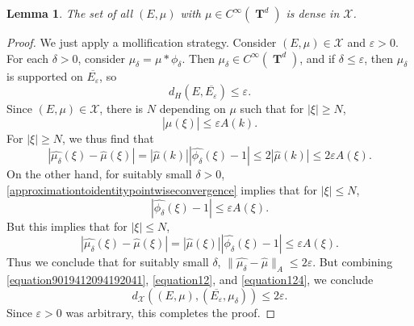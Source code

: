 \documentclass[12pt,reqno]{article}
\numberwithin{equation}{section}
\DeclareMathOperator{\TT}{\mathbf{T}}
\newtheorem{lemma}[theorem]{Lemma}
\begin{document}
\begin{lemma}
    The set of all $(E,\mu)$ with $\mu \in C^\infty(\TT^d)$ is dense in $\mathcal{X}$.
\end{lemma}
\begin{proof}
    We just apply a mollification strategy. Consider $(E,\mu) \in \mathcal{X}$ and $\varepsilon > 0$. For each $\delta > 0$, consider $\mu_\delta = \mu * \phi_\delta$. Then $\mu_\delta \in C^\infty(\TT^d)$, and if $\delta \leq \varepsilon$, then $\mu_\delta$ is supported on $\overline{E_\varepsilon}$, so
    \begin{equation} \label{equation9019412094192041}
        d_H(E,\overline{E_\varepsilon}) \leq \varepsilon.
    \end{equation}
    Since $(E,\mu) \in \mathcal{X}$, there is $N$ depending on $\mu$ such that for $|\xi| \geq N$,
    \[ |\widehat{\mu}(\xi)| \leq \varepsilon A(k). \]
    For $|\xi| \geq N$, we thus find that
    \begin{equation} \label{equation12}
        |\widehat{\mu_\delta}(\xi) - \widehat{\mu}(\xi)| = |\widehat{\mu}(k)||\widehat{\phi_\delta}(\xi) - 1| \leq 2 |\widehat{\mu}(k)| \leq 2\varepsilon A(\xi).
    \end{equation}
    On the other hand, for suitably small $\delta > 0$, \eqref{approximationtoidentitypointwiseconvergence} implies that for $|\xi| \leq N$,
    \[ |\widehat{\phi_\delta}(\xi) - 1| \leq \varepsilon A(\xi). \]
    But this implies that for $|\xi| \leq N$,
    \begin{equation} \label{equation124}
        |\widehat{\mu_\delta}(\xi) - \widehat{\mu}(\xi)| = |\widehat{\mu}(\xi)| |\widehat{\phi_\delta}(\xi) - 1| \leq \varepsilon A(\xi).
    \end{equation}
    Thus we conclude that for suitably small $\delta$, $\| \widehat{\mu_\delta} - \widehat{\mu} \|_A \leq 2 \varepsilon$. But combining \eqref{equation9019412094192041}, \eqref{equation12}, and \eqref{equation124}, we conclude
    \[ d_{\mathcal{X}}((E,\mu), (\overline{E_\varepsilon}, \mu_\delta)) \leq 2 \varepsilon. \]
    Since $\varepsilon > 0$ was arbitrary, this completes the proof.
\end{proof}
\end{document}
